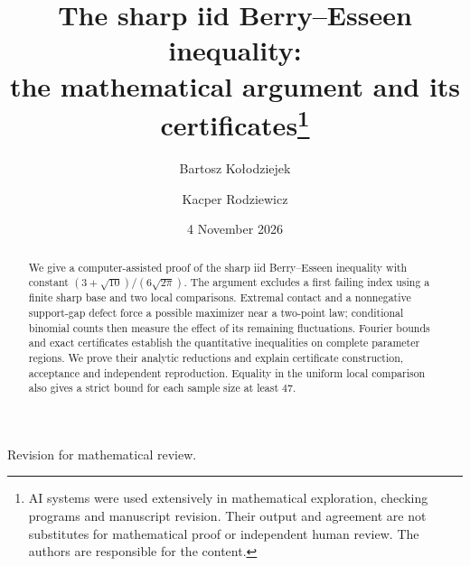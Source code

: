 \documentclass[11pt,a4paper]{article}
\title{The sharp iid Berry--Esseen inequality:\\
the mathematical argument and its certificates\thanks{AI systems were used
extensively in mathematical exploration, checking programs and manuscript
revision. Their output and agreement are not substitutes for mathematical
proof or independent human review. The authors are responsible for the content.}}
\author{Bartosz Ko{\l}odziejek \and Kacper Rodziewicz}
\date{4 November 2026}
\theoremstyle{definition}
\theoremstyle{remark}
\begin{document}
\maketitle
\begin{center}\small
Revision for mathematical review.
\end{center}
\begin{abstract}
We give a computer-assisted proof of the sharp iid Berry--Esseen
inequality with constant $(3+\sqrt{10})/(6\sqrt{2\pi})$.
The argument excludes a first failing index using a finite sharp base
and two local comparisons. Extremal contact and a nonnegative support-gap
defect force a possible maximizer near a two-point law; conditional
binomial counts then measure the effect of its remaining fluctuations.
Fourier bounds and exact certificates establish the quantitative
inequalities on complete parameter regions. We prove their analytic
reductions and explain certificate construction, acceptance and
independent reproduction. Equality in the uniform local comparison
also gives a strict bound for each sample size at least $47$.
\end{abstract}
\begingroup\small\tableofcontents\endgroup








\begingroup\small\raggedright
{}


\endgroup
\end{document}
